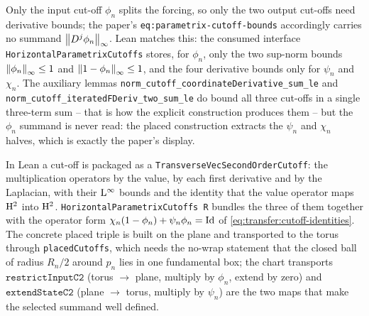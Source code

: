 Only the input cut-off $\phi_n$ splits the forcing, so only the two output cut-offs need
derivative bounds; the paper's \texttt{eq:parametrix-cutoff-bounds} accordingly carries no
summand $\left\|D^j\phi_n\right\|_\infty$.  Lean matches
this: the consumed interface \texttt{HorizontalParametrixCutoffs} stores, for $\phi_n$, only
the two sup-norm bounds $\left\|\phi_n\right\|_\infty\leq1$ and $\left\|1-\phi_n\right\|_\infty\leq1$, and
the four derivative bounds only for $\psi_n$ and $\chi_n$.  The auxiliary lemmas
\texttt{norm\_cutoff\_coordinateDerivative\_sum\_le} and
\texttt{norm\_cutoff\_iteratedFDeriv\_two\_sum\_le} do bound all three cut-offs in a single
three-term sum -- that is how the explicit construction produces them -- but the $\phi_n$
summand is never read: the placed construction extracts the $\psi_n$ and $\chi_n$ halves,
which is exactly the paper's display.

In Lean a cut-off is packaged as a \texttt{TransverseVecSecondOrderCutoff}: the
multiplication operators by the value, by each first derivative and by the Laplacian, with
their $\mathrm{L}^\infty$ bounds and the identity that the value operator maps $\mathrm{H}^2$ into
$\mathrm{H}^2$.  \texttt{HorizontalParametrixCutoffs R} bundles the three of them together with
the operator form $\chi_n(1-\phi_n)+\psi_n\phi_n=\mathrm{Id}$ of
\eqref{eq:transfer:cutoff-identities}.  The concrete placed triple is built on the plane
and transported to the torus through \texttt{placedCutoffs}, which needs the no-wrap
statement that the closed ball of radius $R_n/2$ around $p_n$ lies in one fundamental box;
the chart transports $\texttt{restrictInputC2}$ (torus $\to$ plane, multiply by $\phi_n$,
extend by zero) and $\texttt{extendStateC2}$ (plane $\to$ torus, multiply by $\psi_n$) are
the two maps that make the selected summand well defined.

